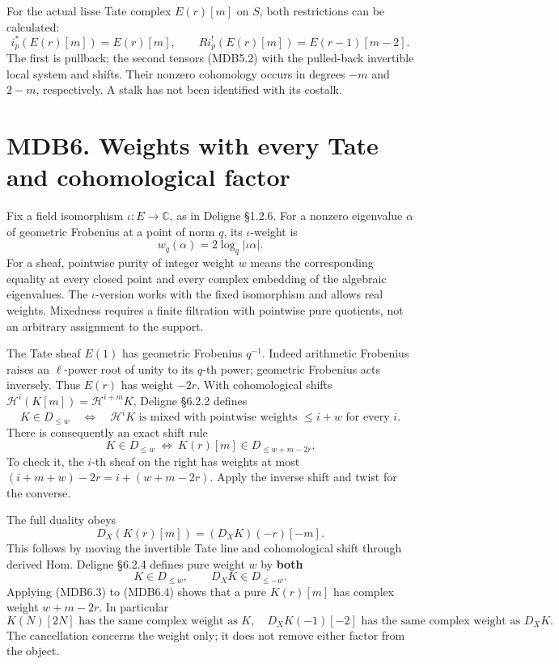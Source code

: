\documentclass[
]{report}
\begin{document}
For the actual lisse Tate complex \(E(r)[m]\) on \(S\), both
restrictions can be calculated: \[
i_p^*(E(r)[m])=E(r)[m],\qquad
Ri_p^!(E(r)[m])=E(r-1)[m-2].
\tag{MDB5.7}
\] The first is pullback; the second tensors (MDB5.2) with the
pulled-back invertible local system and shifts. Their nonzero cohomology
occurs in degrees \(-m\) and \(2-m\), respectively. A stalk has not been
identified with its costalk.

\section{MDB6. Weights with every Tate and cohomological
factor}\label{mdb6.-weights-with-every-tate-and-cohomological-factor}

Fix a field isomorphism \(\iota:E\to\mathbb C\), as in Deligne §1.2.6.
For a nonzero eigenvalue \(\alpha\) of geometric Frobenius at a point of
norm \(q\), its \(\iota\)-weight is \[
w_q(\alpha)=2\log_q|\iota\alpha|.
\tag{MDB6.1}
\] For a sheaf, pointwise purity of integer weight \(w\) means the
corresponding equality at every closed point and every complex embedding
of the algebraic eigenvalues. The \(\iota\)-version works with the fixed
isomorphism and allows real weights. Mixedness requires a finite
filtration with pointwise pure quotients, not an arbitrary assignment to
the support.

The Tate sheaf \(E(1)\) has geometric Frobenius \(q^{-1}\). Indeed
arithmetic Frobenius raises an \(\ell\)-power root of unity to its
\(q\)-th power; geometric Frobenius acts inversely. Thus \(E(r)\) has
weight \(-2r\). With cohomological shifts
\(\mathcal H^i(K[m])=\mathcal H^{i+m}K\), Deligne §6.2.2 defines \[
K\in D_{\leq w}
\quad\Longleftrightarrow\quad
\mathcal H^iK\text{ is mixed with pointwise weights }\leq i+w
\text{ for every }i.
\tag{MDB6.2}
\] There is consequently an exact shift rule \[
K\in D_{\leq w}
\ \Longleftrightarrow\
K(r)[m]\in D_{\leq w+m-2r}.
\tag{MDB6.3}
\] To check it, the \(i\)-th sheaf on the right has weights at most
\((i+m+w)-2r=i+(w+m-2r)\). Apply the inverse shift and twist for the
converse.

The full duality obeys \[
D_X(K(r)[m])=(D_XK)(-r)[-m].
\tag{MDB6.4}
\] This follows by moving the invertible Tate line and cohomological
shift through derived Hom. Deligne §6.2.4 defines pure weight \(w\) by
\textbf{both} \[
K\in D_{\leq w},\qquad D_XK\in D_{\leq-w}.
\tag{MDB6.5}
\] Applying (MDB6.3) to (MDB6.4) shows that a pure \(K(r)[m]\) has
complex weight \(w+m-2r\). In particular \[
K(N)[2N]\text{ has the same complex weight as }K,
\quad
D_XK(-1)[-2]\text{ has the same complex weight as }D_XK.
\tag{MDB6.6}
\] The cancellation concerns the weight only; it does not remove either
factor from the object.
\end{document}
